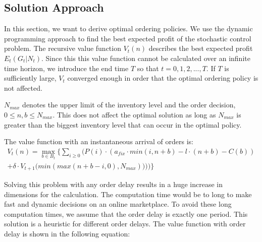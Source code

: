 
\subsection{Solution Approach}

In this section, we want to derive optimal ordering policies.
We use the dynamic programming approach to find the best expected profit of the stochastic control problem.
The recursive value function $V_t(n)$ describes the best expected profit $E_t(G_t | N_t)$.
Since this this value function cannot be calculated over an infinite time horizon, we introduce the end time $T$ so that $t = 0, 1, 2, ..., T$.
If $T$ is sufficiently large, $V_t$ converged enough in order that the optimal ordering policy is not affected.

$N_{max}$ denotes the upper limit of the inventory level and the order decision, $0 \leq n, b \leq N_{max}$. This does not affect the optimal solution as long as $N_{max}$ is greater than the biggest inventory level that can occur in the optimal policy.

The value function with an instantaneous arrival of orders is:
\begin{equation}
\begin{split}
V_t(n) = \max_{b \in B_t} \Bigg\{
\sum_{i \geq 0} \Big(
P(i) \cdot (
a_{fix} \cdot min(i, n + b) %
- l \cdot (n + b) %
- C(b) %
) \\
+ \delta \cdot V_{t+1}\big(min(max(n + b - i, 0), N_{max}))\big)
\Big)\Bigg\}
\end{split}
\label{eq:dyn_prog_no_delay}
\end{equation}

Solving this problem with any order delay results in a huge increase in dimensions for the calculation.
The computation time would be to long to make fast and dynamic decisions on an online marketplace.
To avoid these long computation times, we assume that the order delay is exactly one period.
This solution is a heuristic for different order delays.
The value function with order delay is shown in the following equation:

